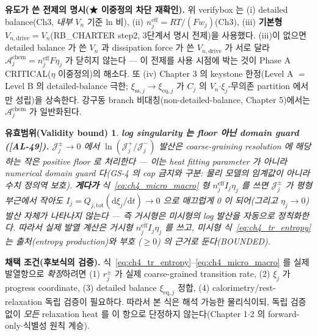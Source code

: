 \documentclass[11pt,a4paper]{article}
\newtheorem*{boundbox}{유효범위(Validity bound)}
\newcommand{\dd}{\mathrm{d}}
\newcommand{\eff}{\mathrm{eff}}
\newcommand{\eq}{\mathrm{eq}}
\newcommand{\drive}{\mathrm{drive}}
\newcommand{\tot}{\mathrm{tot}}
\newcommand{\chem}{\mathrm{chem}}
\newcommand{\sstat}{\mathrm{ss}}
\newcommand{\AL}[1]{\textsf{[AL-#1]}}
\begin{document}
\textbf{유도가 쓴 전제의 명시(★ 이중정의 차단 재확인).} 위 verifybox 는 (i) detailed balance(Ch3, \emph{내부}
$V_n$ 기준 ln 비), (ii) $n_j^{\eff}=RT/(Fw_j)$(Ch3), (iii) \textbf{기본형 $V_{n,\drive}=V_n$}(RB\_CHARTER
step2, 3단계서 명시 전제)을 사용했다. (iii)이 없으면 detailed balance 가 쓴 $V_n$ 과 dissipation force 가 쓴
$V_{n,\drive}$ 가 서로 달라 $\mathcal A_j^{\chem}=n_j^{\eff}F\eta_j$ 가 닫히지 않는다 — 이 전제를 사용 시점에
박는 것이 Phase A CRITICAL($\eta$ 이중정의)의 해소다. 또 (iv) Chapter 3 의 keystone 한정(Level A $=$ Level B
의 detailed-balance 극한; $\xi_{\sstat,j}\to\xi_{\eq,j}$ 가 $C_j$ 의 $V_n$$\cdot$$\xi_j$-무의존 partition 에서만
성립)을 상속한다. 강구동 branch 비대칭(non-detailed-balance, Chapter 5)에서는 $\mathcal A_j^{\chem}$ 가 일반화된다.

\begin{boundbox}
\textbf{log singularity 는 floor 아닌 domain guard (\AL{49}).} $\mathcal J_j^\pm\to0$ 에서 $\ln(\mathcal J_j^+/\mathcal J_j^-)$
발산은 coarse-graining resolution 에 해당하는 작은 positive floor 로 처리한다 — 이는 heat fitting parameter 가
아니라 \emph{numerical domain guard} 다(GS-4 의 cap 금지와 구분: 물리 모델의 임계값이 아니라 수치 정의역 보호).
\textbf{게다가} 식~\eqref{eq:ch4_micro_macro} 형 $n_j^{\eff}I_j\eta_j$ 를 쓰면 $\mathcal J_j^\pm$ 가 평형 부근에서
작아도 $I_j=Q_{j,\tot}(\dd\xi_j/\dd t)\to0$ 으로 \emph{매끄럽게} 0 이 되어(그리고 $\eta_j\to0$) 발산 자체가
나타나지 않는다 — 즉 거시형은 미시형의 log 발산을 자동으로 정칙화한다. 따라서 실제 발열 계산은 거시형
$n_j^{\eff}I_j\eta_j$ 를 쓰고, 미시형 식~\eqref{eq:ch4_tr_entropy} 는 \emph{출처(entropy production)와 부호
($\ge0$) 의 근거}로 둔다(BOUNDED).
\end{boundbox}

\textbf{채택 조건(후보식의 검증).} 식~\eqref{eq:ch4_tr_entropy}--\eqref{eq:ch4_micro_macro} 를 실제 발열항으로
\emph{확정}하려면 (1) $r_j^\pm$ 가 실제 coarse-grained transition rate, (2) $\xi_j$ 가 progress coordinate,
(3) detailed balance $\xi_{\eq,j}$ 정합, (4) calorimetry/rest-relaxation 독립 검증이 필요하다. 따라서 본 식은
해석 가능한 물리식이되, 독립 검증 없이 \emph{모든} relaxation heat 를 이 항으로 단정하지 않는다(Chapter 1$\cdot$2
의 forward-only$\cdot$식별성 원칙 계승).

\end{document}
